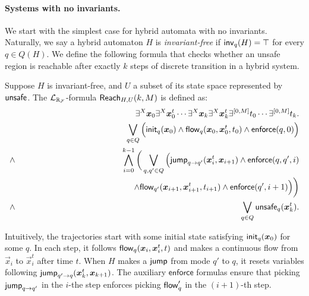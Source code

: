 \documentclass[12pt]{llncs}
\newcommand{\enforce}{\mathsf{enforce}}
\begin{document}
\paragraph{Systems with no invariants.} We start with the simplest case for hybrid automata with no invariants. Naturally, we say a hybrid automaton $H$ is {\em invariant-free} if $\mathsf{inv}_q(H) = \top$ for every $q\in Q(H)$. We define the following formula that checks whether an unsafe region is reachable after exactly $k$ steps of discrete transition in a hybrid system.
\begin{definition}
Suppose $H$ is invariant-free, and $U$ a subset of its state space represented by $\mathsf{unsafe}$. The $\mathcal{L}_{\mathbb{R}_{\mathcal{F}}}$-formula $\mathsf{Reach}_{H,U}(k,M)$ is defined as:
\begin{eqnarray*}
& &\exists^X \vec x_{0} \exists^X\vec x_{0}^t\cdots \exists^X \vec x_{k}\exists^X\vec x_{k}^t\exists^{[0,M]}t_0\cdots \exists^{[0,M]}t_k.\\
& &\bigvee_{q\in Q} \Big(\init_{q}(\vec x_{0})\wedge \flow_{q}(\vec x_{0}, \vec x_{0}^t, t_0)\wedge \enforce(q,0)\Big)\\%
\wedge & & \bigwedge_{i=0}^{k-1}\bigg( \bigvee_{q, q'\in Q} \Big(\jump_{q\rightarrow q'}(\vec x_{i}^t, \vec x_{i+1})\wedge \enforce(q,q',i)\\
& & \hspace{4.7cm}\wedge\flow_{q'}(\vec x_{i+1}, \vec x_{i+1}^t, t_{i+1})\wedge \enforce(q',i+1)\Big)\bigg)\\
\wedge & & \bigvee_{q\in Q} \unsafe_q(\vec x_{k}^t).
\end{eqnarray*}
\end{definition}
Intuitively, the trajectories start with some initial state satisfying $\init_q(\vec x_{0})$ for some $q$. In each step, it follows $\flow_q(\vec x_{i}, \vec x_{i}^t, t)$ and makes a continuous flow from $\vec x_i$ to $\vec x_i^t$ after time $t$. When $H$ makes a $\mathsf{jump}$ from mode $q'$ to $q$, it resets variables following $\jump_{q'\rightarrow q}(\vec x_{k}^t, \vec x_{k+1})$. The auxiliary $\enforce$ formulas ensure that picking $\mathsf{jump}_{q\rightarrow q'}$ in the $i$-the step enforces picking $\mathsf{flow}_q'$ in the $(i+1)$-th step.
\end{document}

